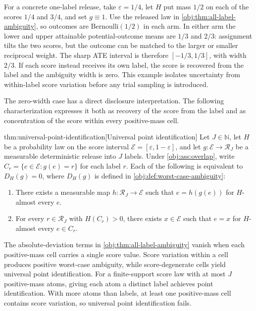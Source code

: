 \documentclass[11pt]{article}
\begin{document}
For a concrete one-label release, take \(\varepsilon=1/4\), let \(H\) put mass \(1/2\) on each of the scores \(1/4\) and \(3/4\), and set \(g\equiv1\). Use the released law in \cref{obj:thm:all-label-ambiguity}, so outcomes are Bernoulli\((1/2)\) in each arm. In either arm the lower and upper attainable potential-outcome means are \(1/3\) and \(2/3\): assignment tilts the two scores, but the outcome can be matched to the larger or smaller reciprocal weight. The sharp ATE interval is therefore \([-1/3,1/3]\), with width \(2/3\). If each score instead receives its own label, the score is recovered from the label and the ambiguity width is zero. This example isolates uncertainty from within-label score variation before any trial sampling is introduced.

The zero-width case has a direct disclosure interpretation. The following characterization expresses it both as recovery of the score from the label and as concentration of the score within every positive-mass cell.

\begin{theoremv}{thm:universal-point-identification}[Universal point identification]
Let \(J\in\mathbb N\), let \(H\) be a probability law on the score interval \(\mathcal E=[\varepsilon,1-\varepsilon]\), and let \(g:\mathcal E\to\mathcal R_J\) be a measurable deterministic release into \(J\) labels. Under \cref{obj:ass:overlap}, write \(C_r=\{e\in\mathcal E:g(e)=r\}\) for each label \(r\). Each of the following is equivalent to \(D_H(g)=0\), where \(D_H(g)\) is defined in \cref{obj:def:worst-case-ambiguity}:
\begin{enumerate}
\item There exists a measurable map \(h:\mathcal R_J\to\mathcal E\) such that \(e=h(g(e))\) for \(H\)-almost every \(e\).
\item For every \(r\in\mathcal R_J\) with \(H(C_r)>0\), there exists \(x\in\mathcal E\) such that \(e=x\) for \(H\)-almost every \(e\in C_r\).
\end{enumerate}
\end{theoremv}

The absolute-deviation terms in \cref{obj:thm:all-label-ambiguity} vanish when each positive-mass cell carries a single score value. Score variation within a cell produces positive worst-case ambiguity, while score-degenerate cells yield universal point identification. For a finite-support score law with at most \(J\) positive-mass atoms, giving each atom a distinct label achieves point identification. With more atoms than labels, at least one positive-mass cell contains score variation, so universal point identification fails.
\end{document}
